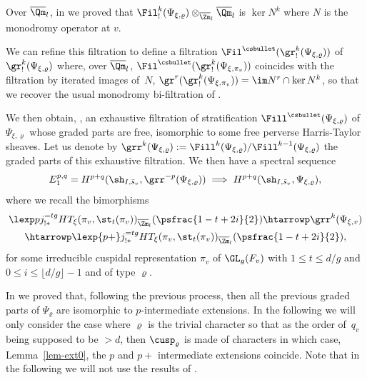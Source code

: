 \begin{remark}
Over $\overline \Qm_l$, in \cite{boyer-torsion} we proved that
$\Fil^k_!(\Psi_{\xi,\varrho}) \otimes_{\overline \Zm_l} \overline \Qm_l$
is $\ker N^k$ where $N$ is the monodromy operator at $v$.

We can refine this filtration to define a filtration
$\Fil^{\csbullet} (\gr^k_!(\Psi_{\xi,\varrho}))$ of $\gr^k_!(\Psi_{\xi,\varrho})$ where,
over $\overline \Qm_l$,
$\Fil^{\csbullet} (\gr^k_!(\Psi_{\xi,\pi_v}))$
coincides with the filtration by iterated images of~$N$, \ie $\gr^r(\gr^k_!(\Psi_{\xi,\pi_v}))=\im N^r \cap \ker N^k$, so that
we recover the usual monodromy bi-filtration of \cite{boyer-invent2}.

We then obtain, \cf \cite{boyer-torsion}, an exhaustive filtration
of stratification $\Fill^{\csbullet}(\Psi_{\xi,\varrho})$ of $\Psi_{\xi,\varrho}$ whose graded parts are free,
isomorphic to some free perverse Harris-Taylor sheaves.
Let us denote by $\grr^k(\Psi_{\xi,\varrho}):=\Fill^k(\Psi_{\xi,\varrho})/\Fill^{k-1}(\Psi_{\xi,\varrho})$
the graded parts of this exhaustive filtration.
We then have a spectral sequence
\begin{equation} \label{eq-ss1}
E_1^{p,q}=H^{p+q}(\sh_{I,\bar s_v},\grr^{-p}(\Psi_{\xi,\varrho})) \implies
H^{p+q}(\sh_{I,\bar s_v},\Psi_{\xi,\varrho}),
\end{equation}
where we recall the bimorphisms
\begin{multline} \label{eq-grppsi}
\lexp p j^{=tg}_{!*} HT_\xi(\pi_v,\st_t(\pi_v))_{\overline \Zm_l}(\psfrac{1-t+2i}{2}) \htarrowp
\grr^k(\Psi_{\xi,v})\\
\htarrowp \lexp {p+} j^{=tg}_{!*} HT_\xi(\pi_v,\st_t(\pi_v))_{\overline \Zm_l}(\psfrac{1-t+2i}{2}),
\end{multline}
for some irreducible cuspidal representation $\pi_v$ of $\GL_g(F_v)$ with $1 \leq t \leq d/g$ and
$0 \leq i \leq \lfloor d/g \rfloor -1$ and of type $\varrho$.
\end{remark}

\begin{remark}
In \cite{boyer-duke} we proved that, following the previous process, then all the previous graded parts of $\Psi_{\varrho}$
are isomorphic to $p$-intermediate extensions.
In the following we will only consider the
case where $\varrho$ is the trivial character so that as the order of~$q_v$
being supposed
to be $>d$, then $\cusp_\varrho$ is made of characters
in which case, \cf Lem\-ma~\ref{lem-ext0}, the $p$ and $p+$ intermediate extensions
coincide. Note that in the following
we will not use the results of \cite{boyer-duke}.
\end{remark}

